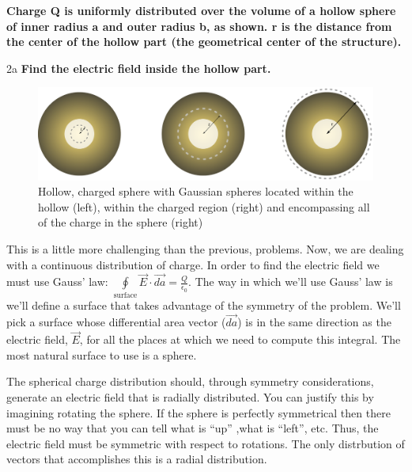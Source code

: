\begin{homeworkProblem}[Quiz 3, Pr. 2]
    \textbf{Charge Q is uniformly distributed over the volume of a
    hollow sphere of inner radius a and outer radius b, as shown. r is
    the distance from the center of the hollow part (the geometrical
    center of the structure).}

    \begin{homeworkSection}{2a}
        \textbf{Find the electric field inside the hollow part.}
        \\
        
        \begin{figure}[t]
            \centering
            \includegraphics[width=.75\textwidth]{./img/gaussianspheres.eps}
            \caption{Hollow, charged sphere with Gaussian spheres
            located within the hollow (left), within the charged region
            (right) and encompassing all of the charge in the sphere
            (right)}
            \label{fig:gaussianspheres.eps}
        \end{figure}

        This is a little more challenging than the previous, problems.
        Now, we are dealing with a continuous distribution of charge. In
        order to find the electric field we must use Gauss' law:
        $\oint\limits_{\text{surface}}
        \vec{E}\cdot\vec{da} = \frac{Q}{\epsilon_0}$. The way in which
        we'll use Gauss' law is we'll define a surface that takes
        advantage of the symmetry of the problem. We'll pick a surface
        whose differential area vector ($\vec{da}$) is in the same
        direction as the electric field, $\vec{E}$, for all the places
        at which we need to compute this integral. The most natural
        surface to use is a sphere.
        
        The spherical charge distribution should, through symmetry
        considerations, generate an electric field that is radially
        distributed. You can justify this by imagining rotating the
        sphere. If the sphere is perfectly symmetrical then there must
        be no way that you can tell what is ``up'' ,what is ``left'',
        etc. Thus, the electric field must be symmetric with respect to
        rotations. The only distrbution of vectors that accomplishes
        this is a radial distribution.
        

\end{homeworkSection}
\end{homeworkProblem}
